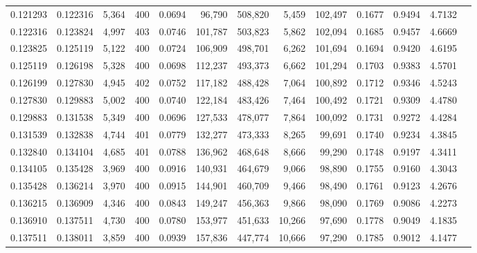 \begin{tabular}{rrrrrrrrrrrrr}
0.121293 & 0.122316 & 5,364 & 400 &                                     0.0694 &  96,790 & 508,820 &   5,459 & 102,497 & 0.1677 & 0.9494 & 4.7132 \\
0.122316 & 0.123824 & 4,997 & 403 &                                     0.0746 & 101,787 & 503,823 &   5,862 & 102,094 & 0.1685 & 0.9457 & 4.6669 \\
0.123825 & 0.125119 & 5,122 & 400 &                                     0.0724 & 106,909 & 498,701 &   6,262 & 101,694 & 0.1694 & 0.9420 & 4.6195 \\
0.125119 & 0.126198 & 5,328 & 400 &                                     0.0698 & 112,237 & 493,373 &   6,662 & 101,294 & 0.1703 & 0.9383 & 4.5701 \\
0.126199 & 0.127830 & 4,945 & 402 &                                     0.0752 & 117,182 & 488,428 &   7,064 & 100,892 & 0.1712 & 0.9346 & 4.5243 \\
0.127830 & 0.129883 & 5,002 & 400 &                                     0.0740 & 122,184 & 483,426 &   7,464 & 100,492 & 0.1721 & 0.9309 & 4.4780 \\
0.129883 & 0.131538 & 5,349 & 400 &                                     0.0696 & 127,533 & 478,077 &   7,864 & 100,092 & 0.1731 & 0.9272 & 4.4284 \\
0.131539 & 0.132838 & 4,744 & 401 &                                     0.0779 & 132,277 & 473,333 &   8,265 &  99,691 & 0.1740 & 0.9234 & 4.3845 \\
0.132840 & 0.134104 & 4,685 & 401 &                                     0.0788 & 136,962 & 468,648 &   8,666 &  99,290 & 0.1748 & 0.9197 & 4.3411 \\
0.134105 & 0.135428 & 3,969 & 400 &                                     0.0916 & 140,931 & 464,679 &   9,066 &  98,890 & 0.1755 & 0.9160 & 4.3043 \\
0.135428 & 0.136214 & 3,970 & 400 &                                     0.0915 & 144,901 & 460,709 &   9,466 &  98,490 & 0.1761 & 0.9123 & 4.2676 \\
0.136215 & 0.136909 & 4,346 & 400 &                                     0.0843 & 149,247 & 456,363 &   9,866 &  98,090 & 0.1769 & 0.9086 & 4.2273 \\
0.136910 & 0.137511 & 4,730 & 400 &                                     0.0780 & 153,977 & 451,633 &  10,266 &  97,690 & 0.1778 & 0.9049 & 4.1835 \\
0.137511 & 0.138011 & 3,859 & 400 &                                     0.0939 & 157,836 & 447,774 &  10,666 &  97,290 & 0.1785 & 0.9012 & 4.1477 \\

\end{tabular}
